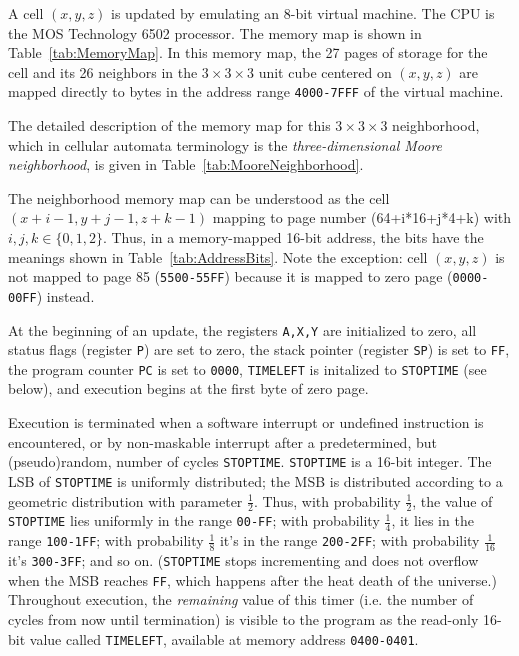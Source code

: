\documentclass{article}
\newcommand\hex[1]{{\tt #1}}
\newcommand\hexrange[2]{\hex{#1}{\tt -}\hex{#2}}
\begin{document}
A cell $(x,y,z)$ is updated by emulating an 8-bit virtual machine.
The CPU is the MOS Technology 6502 processor.
The memory map is shown in Table~\ref{tab:MemoryMap}.
In this memory map, the 27 pages of storage
for the cell and its 26 neighbors
in the $3 \times 3 \times 3$ unit cube centered on $(x,y,z)$
are mapped directly to bytes in the address range \hexrange{4000}{7FFF} of the virtual machine.

The detailed description of the memory map for this $3 \times 3 \times 3$ neighborhood,
which in cellular automata terminology is
the {\em three-dimensional Moore neighborhood},
is given in Table~\ref{tab:MooreNeighborhood}.

The neighborhood memory map can be understood as the cell $(x+i-1,y+j-1,z+k-1)$
mapping to page number (64+i*16+j*4+k) with $i,j,k \in \{0,1,2\}$.
Thus, in a memory-mapped 16-bit address, the bits have the meanings shown in Table~\ref{tab:AddressBits}.
Note the exception: cell $(x,y,z)$ is not mapped to page 85 (\hexrange{5500}{55FF})
because it is mapped to zero page (\hexrange{0000}{00FF}) instead.

At the beginning of an update,
the registers {\tt A,X,Y} are initialized to zero,
all status flags (register {\tt P}) are set to zero,
the stack pointer (register {\tt SP}) is set to \hex{FF},
the program counter {\tt PC} is set to \hex{0000},
{\tt TIMELEFT} is initalized to {\tt STOPTIME} (see below),
and execution begins at the first byte of zero page.

Execution is terminated
when a software interrupt or undefined instruction is encountered,
or by non-maskable interrupt after a predetermined, but (pseudo)random, number of cycles {\tt STOPTIME}.
{\tt STOPTIME} is a 16-bit integer.
The LSB of {\tt STOPTIME} is uniformly distributed;
the MSB is distributed according to a geometric distribution with parameter $\frac{1}{2}$.
Thus, with probability $\frac{1}{2}$, the value of {\tt STOPTIME} lies uniformly in the range \hexrange{00}{FF};
with probability $\frac{1}{4}$, it lies in the range \hexrange{100}{1FF};
with probability $\frac{1}{8}$ it's in the range \hexrange{200}{2FF};
with probability $\frac{1}{16}$ it's \hexrange{300}{3FF};
and so on.
({\tt STOPTIME} stops incrementing and does not overflow when the MSB reaches \hex{FF},
which happens after the heat death of the universe.)
Throughout execution, the {\em remaining} value of this timer
(i.e. the number of cycles from now until termination)
is visible to the program
as the read-only 16-bit value called {\tt TIMELEFT},
available at memory address \hexrange{0400}{0401}.
\end{document}

